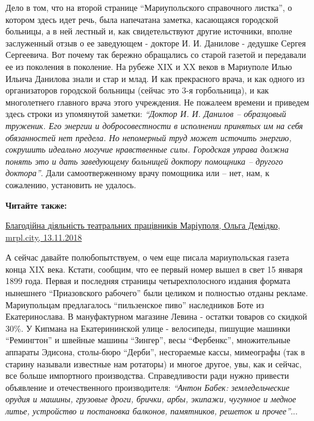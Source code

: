Дело в том, что на второй странице \enquote{Мариупольского справочного листка}, о
котором здесь идет речь, была напечатана заметка, касающаяся городской
больницы, а в ней лестный и, как свидетельствуют другие источники, вполне
заслуженный отзыв о ее заведующем - докторе И. И. Данилове - дедушке Сергея
Сергеевича. Вот почему так бережно обращались со старой газетой и передавали ее
из поколения в поколение. На рубеже XIX и XX веков в Мариуполе Илью Ильича
Данилова знали и стар и млад. И как прекрасного врача, и как одного из
организаторов городской больницы (сейчас это 3-я горбольница), и как
многолетнего главного врача этого учреждения. Не пожалеем времени и приведем
здесь строки из упомянутой заметки: \emph{\enquote{Доктор И. И. Данилов – образцовый труженик.
Его энергии и добросовестности в исполнении принятых им на себя обязанностей
нет предела. Но непомерный труд может источить энергию, сокрушить идеально
могучие нравственные силы. Городская управа должна понять это и дать
заведующему больницей доктору помощника – другого доктора}}. Дали
самоотверженному врачу помощника или – нет, нам, к сожалению, установить не
удалось.

\textbf{Читайте также:} 

\href{https://mrpl.city/blogs/view/blagodijna-diyalnist-teatralnih-pratsivnikiv-mariupolya}{Благодійна діяльність театральних працівників Маріуполя, Ольга Демідко, mrpl.city, 13.11.2018}

А сейчас давайте полюбопытствуем, о чем еще писала мариупольская газета конца
XIX века. Кстати, сообщим, что ее первый номер вышел в свет 15 января 1899
года. Первая и последняя страницы четырехполосного издания формата нынешнего
\enquote{Приазовского рабочего} были целиком и полностью отданы рекламе. Мариупольцам
предлагалось \enquote{пильзенское пиво} наследников Боте из Екатеринослава. В
мануфактурном магазине Левина - остатки товаров со скидкой 30\%. У Кипмана на
Екатерининской улице - велосипеды, пишущие машинки \enquote{Ремингтон} и швейные машины
\enquote{Зингер}, весы \enquote{Фербенкс}, множительные аппараты Эдисона, столы-бюро \enquote{Дерби},
несгораемые кассы, мимеографы (так в старину называли известные нам ротаторы) и
многое другое, увы, как и сейчас, все больше импортного производства.
Справедливости ради нужно привести объявление и отечественного производителя:
\emph{\enquote{Антон Бабек: земледельческие орудия и машины, грузовые дроги, брички, арбы,
экипажи, чугунное и медное литье, устройство и постановка балконов, памятников,
решеток и прочее}}...

